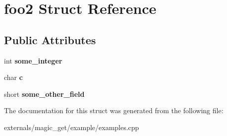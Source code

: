 \hypertarget{structfoo2}{}\section{foo2 Struct Reference}
\label{structfoo2}
\subsection*{Public Attributes}
\begin{DoxyCompactItemize}
\item 
\mbox{\label{structfoo2_ae16172fac19233a8c179c55a49737a50}} 
int {\bfseries some\+\_\+integer}
\item 
\mbox{\label{structfoo2_a8d785caa790a06bdc667cc249689e5ae}} 
char {\bfseries c}
\item 
\mbox{\label{structfoo2_a7d06efa0a1ff5d0290523c305a85aba6}} 
short {\bfseries some\+\_\+other\+\_\+field}
\end{DoxyCompactItemize}


The documentation for this struct was generated from the following file\+:\begin{DoxyCompactItemize}
\item 
externals/magic\+\_\+get/example/examples.\+cpp\end{DoxyCompactItemize}
